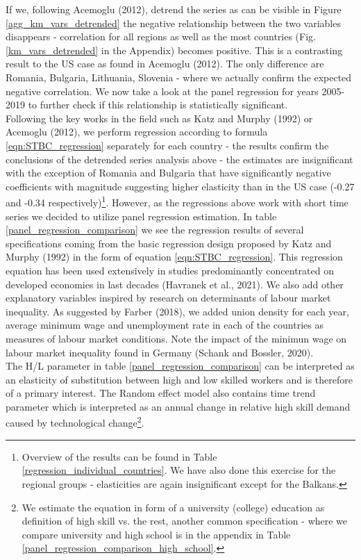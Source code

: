 \documentclass{article}
\begin{document}
If we, following Acemoglu (2012), detrend the series as can be visible in Figure \ref{agg_km_vars_detrended} the negative relationship between the two variables disappears - correlation for all regions as well as the most countries (Fig. \ref{km_vars_detrended} in the Appendix) becomes positive. This is a contrasting result to the US case as found in Acemoglu (2012). The only difference are Romania, Bulgaria, Lithuania, Slovenia - where we actually confirm the expected negative correlation.
We now take a look at the panel regression for years 2005-2019 to further check if this relationship is statistically significant.\\

Following the key works in the field such as Katz and Murphy (1992) or Acemoglu (2012), we perform regression according to formula \ref{eqn:STBC_regression} separately for each country - the results confirm the conclusions of the detrended series analysis above - the estimates are insignificant with the exception of Romania and Bulgaria that have significantly negative coefficients with magnitude suggesting higher elasticity than in the US case (-0.27 and -0.34 respectively)\footnote{Overview of the results can be found in Table \ref{regression_individual_countries}. We have also done this exercise for the regional groups - elasticities are again insignificant except for the Balkans.}.
However, as the regressions above work with short time series we decided to utilize panel regression estimation. In table \ref{panel_regression_comparison} we see the regression results of several specifications coming from the basic regression design proposed by Katz and Murphy (1992) in the form of equation \ref{eqn:STBC_regression}. This regression equation has been used extensively in studies predominantly concentrated on developed economies in last decades (Havranek et al., 2021). We also add other explanatory variables inspired by research on determinants of labour market inequality. As suggested by Farber (2018), we added union density for each year, average minimum wage and unemployment rate in each of the countries as measures of labour market conditions. Note the impact of the minimun wage on labour market inequality found in Germany (Schank and Bossler, 2020).\\
The H/L parameter in table \ref{panel_regression_comparison} can be interpreted as an elasticity of substitution between high and low skilled workers and is therefore of a primary interest. The Random effect model also contains time trend parameter which is interpreted as an annual change in relative high skill demand caused by technological change\footnote{We estimate the equation in form of a university (college) education as definition of high skill vs. the rest, another common specification - where we compare university and high school is in the appendix in Table \ref{panel_regression_comparison_high_school}.}.
\end{document}
